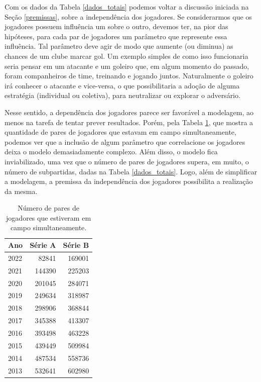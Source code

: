 Com os dados da Tabela \ref{dados_totais} podemos voltar a discussão iniciada na Seção \ref{premissas}, sobre a independência dos jogadores. Se considerarmos que os jogadores possuem influência um sobre o outro, devemos ter, na pior das hipóteses, para cada par de jogadores um parâmetro que represente essa influência. Tal parâmetro deve agir de modo que aumente (ou diminua) as chances de um clube marcar gol. Um exemplo simples de como isso funcionaria seria pensar em um atacante e um goleiro que, em algum momento do passado, foram companheiros de time, treinando e jogando juntos. Naturalmente o goleiro irá conhecer o atacante e vice-versa, o que possibilitaria a adoção de alguma estratégia (individual ou coletiva), para neutralizar ou explorar o adversário.

Nesse sentido, a dependência dos jogadores parece ser favorável a modelagem, ao menos na tarefa de tentar prever resultados. Porém, pela Tabela \ref{jogadores_correlacionados}, que mostra a quantidade de pares de jogadores que estavam em campo simultaneamente, podemos ver que a inclusão de algum parâmetro que correlacione os jogadores deixa o modelo demasiadamente complexo. Além disso, o modelo fica inviabilizado, uma vez que o número de pares de jogadores supera, em muito, o número de subpartidas, dadas na Tabela \ref{dados_totais}. Logo, além de simplificar a modelagem, a premissa da independência dos jogadores possibilita a realização da mesma.
\begin{table}[H]
    \centering
    \begin{tabular}{l|rr}
        \hline
         Ano &   Série A &   Série B \\ \hline
        2022 &     82841 &    169001 \\
        2021 &    144390 &    225203 \\
        2020 &    201045 &    284071 \\
        2019 &    249634 &    318987 \\
        2018 &    298906 &    368844 \\
        2017 &    345388 &    413307 \\
        2016 &    393498 &    463228 \\
        2015 &    439449 &    509984 \\
        2014 &    487534 &    558736 \\
        2013 &    532641 &    602980 \\
    \hline
    \end{tabular}
    \caption{Número de pares de jogadores que estiveram em campo simultaneamente.}
    \label{jogadores_correlacionados}
\end{table}

